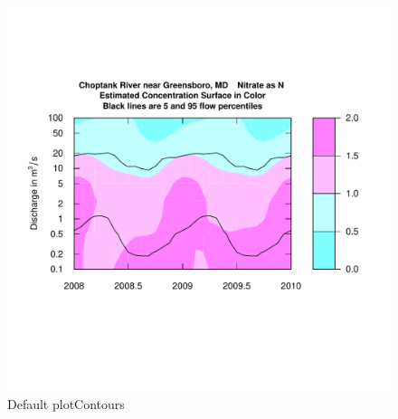\documentclass[a4paper,11pt]{article}\usepackage{graphicx, color}
\newenvironment{knitrout}{}{} %
\begin{document}
\begin{knitrout}
\color{fgcolor}\begin{figure}[]

\includegraphics[width=1\linewidth,height=1\linewidth]{figure/plotContours} \caption[Default plotContours]{Default plotContours\label{fig:plotContours}}
\end{figure}


\end{knitrout}
\end{document}
